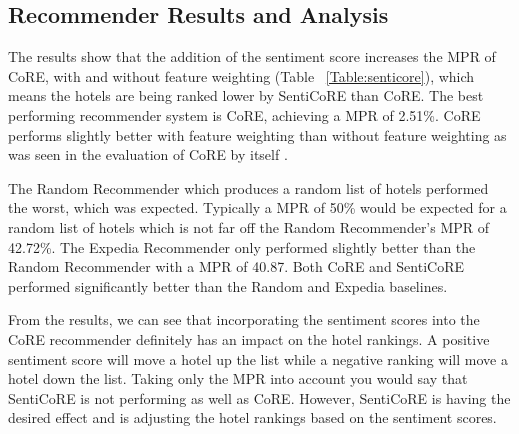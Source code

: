 \subsection{Recommender Results and Analysis}

The results show that the addition of the sentiment score increases the MPR of CoRE, with and without feature weighting (Table ~\ref{Table:senticore}), which means the hotels are being ranked lower by SentiCoRE than CoRE. The best performing recommender system is CoRE, achieving a MPR of 2.51\%. CoRE performs slightly better with feature weighting than without feature weighting as was seen in the evaluation of CoRE by itself \cite{core2019}. 

The Random Recommender which produces a random list of hotels performed the worst, which was expected. Typically a MPR of 50\% would be expected for a random list of hotels which is not far off the Random Recommender's MPR of 42.72\%. The Expedia Recommender only performed slightly better than the Random Recommender with a MPR of 40.87. Both CoRE and SentiCoRE performed significantly better than the Random and Expedia baselines.

\begin{table}[h!]
\caption{Recommender Systems Performance.}
\label{Table:senticore}
\end{table}

From the results, we can see that incorporating the sentiment scores into the CoRE recommender definitely has an impact on the hotel rankings. A positive sentiment score will move a hotel up the list while a negative ranking will move a hotel down the list. Taking only the MPR into account you would say that SentiCoRE is not performing as well as CoRE. However, SentiCoRE is having the desired effect and is adjusting the hotel rankings based on the sentiment scores.